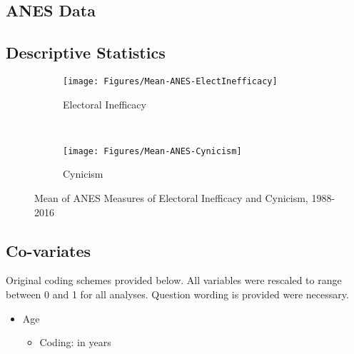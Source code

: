 \documentclass[12pt]{article}
\begin{document}
\begin{appendices}
\begin{refsection}











\clearpage
\section{ANES Data}\label{app:variablecoding}

\subsection{Descriptive Statistics}
\begin{figure}[h!]
\centering
   \begin{subfigure}[b]{0.75\textwidth}
	   \centering
	   \texttt{[image: Figures/Mean-ANES-ElectInefficacy]}
	   \caption{Electoral Inefficacy}
	   \label{fig:mean-electineff} 
	\end{subfigure}
\\ 
	\begin{subfigure}[b]{0.75\textwidth}
		\centering
	   \texttt{[image: Figures/Mean-ANES-Cynicism]} 
	   \caption{Cynicism}
	   \label{fig:mean-cyn}
	\end{subfigure}
	\caption{Mean of ANES Measures of Electoral Inefficacy and Cynicism, 1988-2016}\label{fig:mean-alienation}
\end{figure}



\subsection{Co-variates}
\singlespacing
Original coding schemes provided below. All variables were rescaled to range between 0 and 1 for all analyses. Question wording is provided were necessary.

\begin{itemize}
	\item Age
		\begin{itemize}
			\item Coding: in years
		\end{itemize}
		

\end{itemize}
\end{refsection}
\end{appendices}
\end{document}

